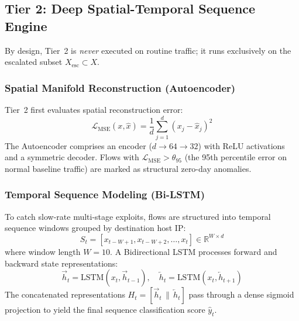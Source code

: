 \documentclass[conference]{IEEEtran}
\begin{document}
\subsection{Tier 2: Deep Spatial-Temporal Sequence Engine}
By design, Tier~2 is \textit{never} executed on routine traffic; it runs exclusively on the escalated subset $X_{\text{esc}} \subset X$.

\subsubsection{Spatial Manifold Reconstruction (Autoencoder)}
Tier~2 first evaluates spatial reconstruction error:
\begin{equation}
\mathcal{L}_{\text{MSE}}(x, \hat{x}) = \frac{1}{d} \sum_{j=1}^d (x_j - \hat{x}_j)^2
\label{eq:autoencoder_loss}
\end{equation}
The Autoencoder comprises an encoder ($d \to 64 \to 32$) with ReLU activations and a symmetric decoder. Flows with $\mathcal{L}_{\text{MSE}} > \theta_{95}$ (the 95th percentile error on normal baseline traffic) are marked as structural zero-day anomalies.

\subsubsection{Temporal Sequence Modeling (Bi-LSTM)}
To catch slow-rate multi-stage exploits, flows are structured into temporal sequence windows grouped by destination host IP:
\begin{equation}
S_t = [x_{t-W+1}, x_{t-W+2}, \dots, x_t] \in \mathbb{R}^{W \times d}
\label{eq:sequence_window}
\end{equation}
where window length $W = 10$. A Bidirectional LSTM processes forward and backward state representations:
\begin{equation}
\vec{h}_t = \text{LSTM}(x_t, \vec{h}_{t-1}), \quad \overleftarrow{h}_t = \text{LSTM}(x_t, \overleftarrow{h}_{t+1})
\label{eq:bilstm}
\end{equation}
The concatenated representations $H_t = [\vec{h}_t \,\|\, \overleftarrow{h}_t]$ pass through a dense sigmoid projection to yield the final sequence classification score $\hat{y}_t$.
\end{document}
